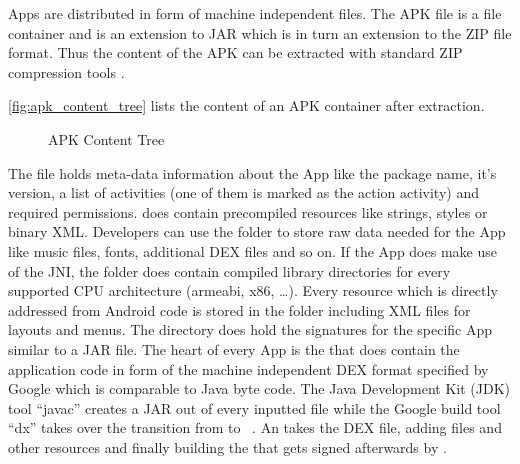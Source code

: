 Apps are distributed in form of machine independent  files.
The APK file is a file container and is an extension to
JAR which is in turn an extension to the ZIP file format.
Thus the content of the APK can be extracted with standard ZIP
compression tools \parencite{securityinternals}.

\autoref{fig:apk_content_tree} lists the content of an APK container
after extraction.

\begin{figure}[htb]
\caption[APK Content Tree]{APK Content Tree}
\label{fig:apk_content_tree}
\end{figure}

The  file holds meta-data information
about the App like the package name, it's version, a list of
activities (one of them is marked as the action  activity) and required permissions. 
does contain precompiled resources like strings, styles
or binary XML. Developers can use the  folder
to store raw data needed for the App like music files,
fonts, additional DEX files and so on. If the App does make use of the JNI,
the  folder does contain compiled library directories
for every supported CPU architecture (armeabi, x86, \ldots).
Every resource which is directly addressed from Android code
is stored in the  folder including XML files for
layouts and menus. The  directory does hold
the signatures for the specific App similar to a JAR file.
The heart of every App is the  that does
contain the application code in form of the machine independent
DEX format specified by Google \parencite{dex} which is comparable to
Java byte code. The Java Development
Kit (JDK) tool ``javac'' creates a JAR out of every inputted
  file while the Google build tool ``dx'' takes over
 the transition from  to  ~\parencite{dxtool}.
 An  takes the DEX file, adding  files and
 other resources and finally building the  that gets signed
 afterwards by .

